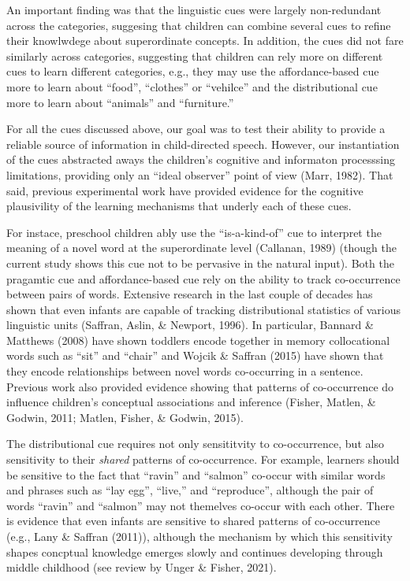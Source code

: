\documentclass[english,,man,floatsintext]{apa6}
\begin{document}
An important finding was that the linguistic cues were largely non-redundant across the categories, suggesing that children can combine several cues to refine their knowlwdege about superordinate concepts. In addition, the cues did not fare similarly across categories, suggesting that children can rely more on different cues to learn different categories, e.g., they may use the affordance-based cue more to learn about \enquote{food}, \enquote{clothes} or \enquote{vehilce} and the distributional cue more to learn about \enquote{animals} and \enquote{furniture.}

For all the cues discussed above, our goal was to test their ability to provide a reliable source of information in child-directed speech. However, our instantiation of the cues abstracted aways the children's cognitive and informaton processsing limitations, providing only an \enquote{ideal observer} point of view (Marr, 1982). That said, previous experimental work have provided evidence for the cognitive plausivility of the learning mechanisms that underly each of these cues.

For instace, preschool children ably use the \enquote{is-a-kind-of} cue to interpret the meaning of a novel word at the superordinate level (Callanan, 1989) (though the current study shows this cue not to be pervasive in the natural input). Both the pragamtic cue and affordance-based cue rely on the ability to track co-occurrence between pairs of words. Extensive research in the last couple of decades has shown that even infants are capable of tracking distributional statistics of various linguistic units (Saffran, Aslin, \& Newport, 1996). In particular, Bannard \& Matthews (2008) have shown toddlers encode together in memory collocational words such as \enquote{sit} and \enquote{chair} and Wojcik \& Saffran (2015) have shown that they encode relationships between novel words co-occurring in a sentence. Previous work also provided evidence showing that patterns of co-occurrence do influence children's conceptual associations and inference (Fisher, Matlen, \& Godwin, 2011; Matlen, Fisher, \& Godwin, 2015).

The distributional cue requires not only sensititvity to co-occurrence, but also sensitivity to their \emph{shared} patterns of co-occurrence. For example, learners should be sensitive to the fact that \enquote{ravin} and \enquote{salmon} co-occur with similar words and phrases such as \enquote{lay egg}, \enquote{live,} and \enquote{reproduce}, although the pair of words \enquote{ravin} and \enquote{salmon} may not themelves co-occur with each other. There is evidence that even infants are sensitive to shared patterns of co-occurrence (e.g., Lany \& Saffran (2011)), although the mechanism by which this sensitivity shapes concptual knowledge emerges slowly and continues developing through middle childhood (see review by Unger \& Fisher, 2021).
\end{document}
